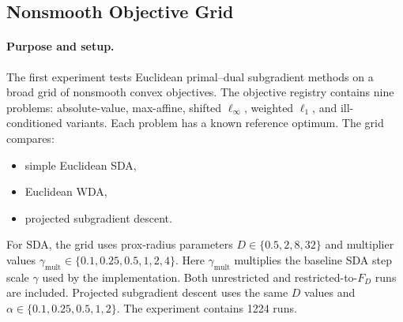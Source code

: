 \documentclass[11pt]{article}
\begin{document}
\subsection{Nonsmooth Objective Grid}
\label{subsec:nonsmooth-grid}

\paragraph{Purpose and setup.}
The first experiment tests Euclidean primal--dual subgradient methods on a broad
grid of nonsmooth convex objectives.  The objective registry contains nine
problems: absolute-value, max-affine, shifted \(\ell_\infty\), weighted
\(\ell_1\), and ill-conditioned variants.  Each problem has a known reference
optimum.  The grid compares:
\begin{itemize}
    \item simple Euclidean SDA,
    \item Euclidean WDA,
    \item projected subgradient descent.
\end{itemize}
For SDA, the grid uses prox-radius parameters
\(D\in\{0.5,2,8,32\}\) and multiplier values
\(\gamma_{\mathrm{mult}}\in\{0.1,0.25,0.5,1,2,4\}\).  Here
\(\gamma_{\mathrm{mult}}\) multiplies the baseline SDA step scale \(\gamma\)
used by the implementation.  Both unrestricted and restricted-to-\(F_D\) runs
are included.  Projected subgradient descent uses the same \(D\) values and
\(\alpha\in\{0.1,0.25,0.5,1,2\}\).  The experiment contains 1224 runs.

\begin{table}[htbp]
\centering
\small
{}
\caption{Aggregate final objective gaps \(f(\hat x)-f^\star\) for the nonsmooth objective grid.}
\label{tab:nonsmooth-summary}
\end{table}
\end{document}
